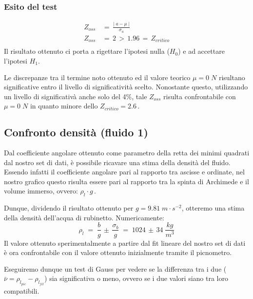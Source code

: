\documentclass{article}
\begin{document}
\subsubsection{Esito del test}
\begin{equation}
\begin{split}
    Z_{oss} \,&= \,\frac{|\;a - \mu\;|}{\sigma_{a}}
    \\[0.3cm]
    Z_{oss} \,&= \,2 \,> \,1.96 \,= \,Z_{critico} \\[0.2cm]
\end{split}
\end{equation}
Il risultato ottenuto ci porta a rigettare l'ipotesi nulla ($H_0$) e ad accettare l'ipotesi $H_1$. 

Le discrepanze tra il termine noto ottenuto ed il valore teorico $\mu=0\;N$ risultano significative entro il livello di significatività scelto. Nonostante questo, utilizzando un livello di significativà anche solo del 4\%, tale $Z_{oss}$ risulta confrontabile con $\mu=0\;N$ in quanto minore dello $Z_{critico} = 2.6$\,. 
\vspace{0.2cm}

\subsection{Confronto densità (fluido 1)}
Dal coefficiente angolare ottenuto come parametro della retta dei minimi quadrati dal nostro set di dati, è possibile ricavare una stima della densità del fluido. Essendo infatti il coefficiente angolare pari al rapporto tra ascisse e ordinate, nel nostro grafico questo risulta essere pari al rapporto tra la spinta di Archimede e il volume immerso, ovvero: $\rho_{l}\cdot g\,$.

Dunque, dividendo il risultato ottenuto per $g = 9.81\;m\cdot s^{-2}$, otteremo una stima della densità dell'acqua di rubinetto. Numericamente: 
\begin{equation*}
    \rho_l \; = \;\frac{b}{g} \,\pm \,\frac{\sigma_b}{g}\;=\; 1024 \,\pm \,34 \; \frac{kg}{m^3}
\end{equation*}
Il valore ottenuto sperimentalmente a partire dal fit lineare del nostro set di dati è ora confrontabile con il valore ottenuto inizialmente tramite il picnometro. 

Eseguiremo dunque un test di Gauss per vedere se la differenza tra i due ($\bar{\nu} = \rho_{l_{pic}} - \rho_{l_{fit}}$) sia significativa o meno, ovvero se i due valori siano tra loro compatibili. 
\end{document}
